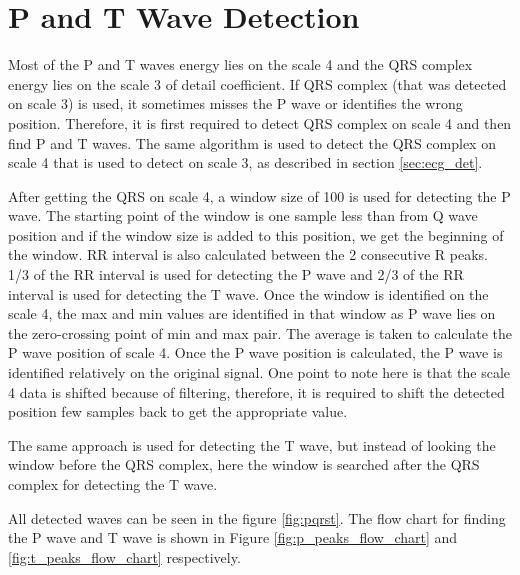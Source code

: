 \section{P and T Wave Detection}
Most of the P and T waves energy lies on the scale 4 and the QRS complex energy lies on the scale 3 of detail coefficient. If QRS complex (that was detected on scale 3) is used, it sometimes misses the P wave or identifies the wrong position. Therefore, it is first required to detect QRS complex on scale 4 and then find P and T waves. The same algorithm is used to detect the QRS complex on scale 4 that is used to detect on scale 3, as described in section \ref{sec:ecg_det}.

After getting the QRS on scale 4, a window size of 100 is used for detecting the P wave. The starting point of the window is one sample less than from Q wave position and if the window size is added to this position, we get the beginning of the window. RR interval is also calculated between the 2 consecutive R peaks. 1/3 of the RR interval is used for detecting the P wave and 2/3 of the RR interval is used for detecting the T wave. Once the window is identified on the scale 4, the max and min values are identified in that window as P wave lies on the zero-crossing point of min and max pair. The average is taken to calculate the P wave position of scale 4. Once the P wave position is calculated, the P wave is identified relatively on the original signal. One point to note here is that the scale 4 data is shifted because of filtering, therefore, it is required to shift the detected position few samples back to get the appropriate value.

The same approach is used for detecting the T wave, but instead of looking the window before the QRS complex, here the window is searched after the QRS complex for detecting the T wave.

All detected waves can be seen in the figure \ref{fig:pqrst}. The flow chart for finding the P wave and T wave is shown in Figure \ref{fig:p_peaks_flow_chart} and \ref{fig:t_peaks_flow_chart} respectively.


